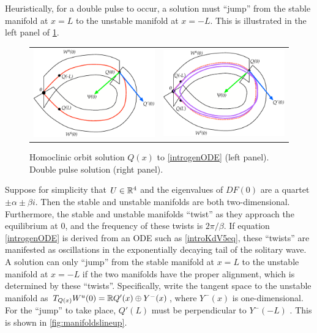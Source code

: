\documentclass[thesis.tex]{subfiles}
\begin{document}
Heuristically, for a double pulse to occur, a solution must ``jump'' from the stable manifold at $x = L$ to the unstable manifold at $x = -L$. This is illustrated in the left panel of \cref{fig:wswu}.
\begin{figure}
\begin{center}
\begin{tabular}{cc}
\includegraphics[width=8cm]{images/intro/WsWu} &
\includegraphics[width=8cm]{images/intro/WsWuDouble}
\end{tabular}
\caption[Homoclinic orbit and double pulse]{Homoclinic orbit solution $Q(x)$ to \cref{introgenODE} (left panel). Double pulse solution (right panel). }
\label{fig:wswu}
\end{center}
\end{figure}
Suppose for simplicity that $U \in \mathbb{R}^4$ and the eigenvalues of $DF(0)$ are a quartet $\pm \alpha \pm \beta i$. Then the stable and unstable manifolds are both two-dimensional. Furthermore, the stable and unstable manifolds ``twist'' as they approach the equilibrium at 0, and the frequency of these twists is $2 \pi / \beta$. If equation \cref{introgenODE} is derived from an ODE such as \cref{introKdV5eq}, these ``twists'' are manifested as oscillations in the exponentially decaying tail of the solitary wave. A solution can only ``jump'' from the stable manifold at $x = L$ to the unstable manifold at $x = -L$ if the two manifolds have the proper alignment, which is determined by these ``twists''. Specifically, write the tangent space to the unstable manifold as $T_{Q(x)}W^u(0) = \mathbb{R} Q'(x) \oplus Y^-(x)$, where $Y^-(x)$ is one-dimensional. For the ``jump'' to take place, $Q'(L)$ must be perpendicular to $Y^-(-L)$ \cite{Sandstede1993,Sandstede2002}. This is shown in \cref{fig:manifoldslineup}.
\end{document}
